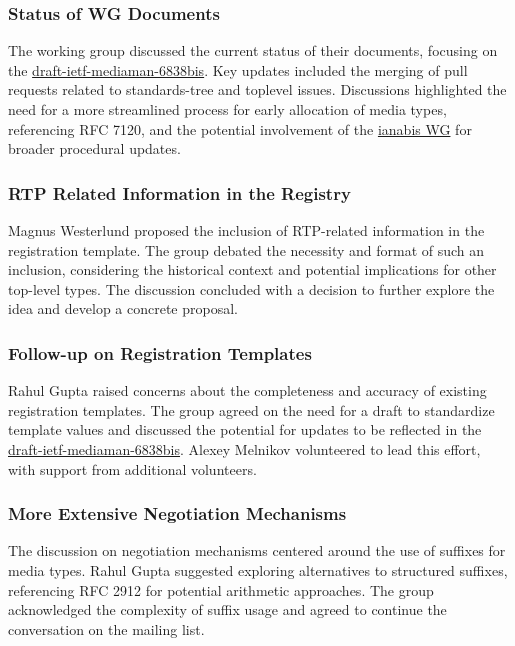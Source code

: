 \documentclass{article}
\begin{document}
\subsubsection{Status of WG Documents}
The working group discussed the current status of their documents, focusing on the \href{https://datatracker.ietf.org/doc/html/draft-ietf-mediaman-6838bis}{draft-ietf-mediaman-6838bis}. Key updates included the merging of pull requests related to standards-tree and toplevel issues. Discussions highlighted the need for a more streamlined process for early allocation of media types, referencing RFC 7120, and the potential involvement of the \href{https://datatracker.ietf.org/wg/ianabis/about/}{ianabis WG} for broader procedural updates.

\subsubsection{RTP Related Information in the Registry}
Magnus Westerlund proposed the inclusion of RTP-related information in the registration template. The group debated the necessity and format of such an inclusion, considering the historical context and potential implications for other top-level types. The discussion concluded with a decision to further explore the idea and develop a concrete proposal.

\subsubsection{Follow-up on Registration Templates}
Rahul Gupta raised concerns about the completeness and accuracy of existing registration templates. The group agreed on the need for a draft to standardize template values and discussed the potential for updates to be reflected in the \href{https://datatracker.ietf.org/doc/html/draft-ietf-mediaman-6838bis}{draft-ietf-mediaman-6838bis}. Alexey Melnikov volunteered to lead this effort, with support from additional volunteers.

\subsubsection{More Extensive Negotiation Mechanisms}
The discussion on negotiation mechanisms centered around the use of suffixes for media types. Rahul Gupta suggested exploring alternatives to structured suffixes, referencing RFC 2912 for potential arithmetic approaches. The group acknowledged the complexity of suffix usage and agreed to continue the conversation on the mailing list.
\end{document}
